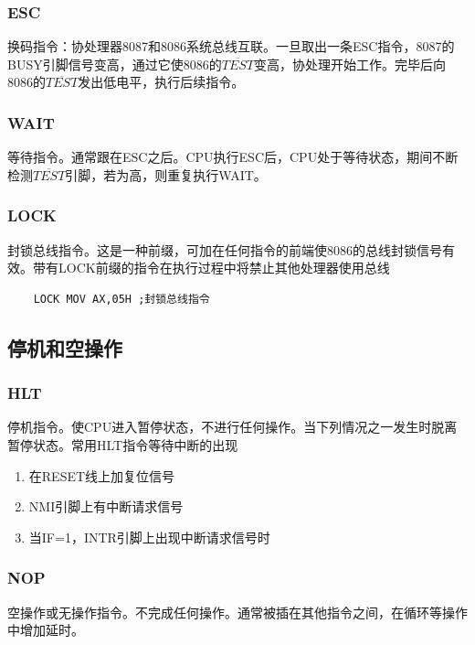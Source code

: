 \subsubsection{ESC}
换码指令：协处理器8087和8086系统总线互联。一旦取出一条ESC指令，8087的BUSY引脚信号变高，通过它使8086的$\overline{TEST}$变高，协处理开始工作。完毕后向8086的$\overline{TEST}$发出低电平，执行后续指令。
\subsubsection{WAIT}
等待指令。通常跟在ESC之后。CPU执行ESC后，CPU处于等待状态，期间不断检测$\overline{TEST}$引脚，若为高，则重复执行WAIT。
\subsubsection{LOCK}
封锁总线指令。这是一种前缀，可加在任何指令的前端使8086的总线封锁信号有效。带有LOCK前缀的指令在执行过程中将禁止其他处理器使用总线
\begin{lstlisting}
    LOCK MOV AX,05H ;封锁总线指令
\end{lstlisting}
\subsection{停机和空操作}
\subsubsection{HLT}
停机指令。使CPU进入暂停状态，不进行任何操作。当下列情况之一发生时脱离暂停状态。常用HLT指令等待中断的出现
\begin{enumerate}
    \item 在RESET线上加复位信号
    \item NMI引脚上有中断请求信号
    \item 当IF=1，INTR引脚上出现中断请求信号时
\end{enumerate}
\subsubsection{NOP}
空操作或无操作指令。不完成任何操作。通常被插在其他指令之间，在循环等操作中增加延时。